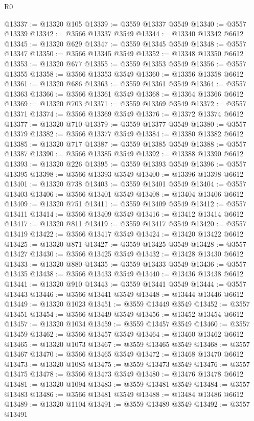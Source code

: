 \begin{lexlean}{R0}
\begin{coremodule}
@13337 := @13320 @105
@13339 := @3559 @13337 @3549
@13340 := @3557 @13339
@13342 := @3566 @13337 @3549
@13344 := @13340 @13342 @6612
@13345 := @13320 @629
@13347 := @3559 @13345 @3549
@13348 := @3557 @13347
@13350 := @3566 @13345 @3549
@13352 := @13348 @13350 @6612
@13353 := @13320 @677
@13355 := @3559 @13353 @3549
@13356 := @3557 @13355
@13358 := @3566 @13353 @3549
@13360 := @13356 @13358 @6612
@13361 := @13320 @686
@13363 := @3559 @13361 @3549
@13364 := @3557 @13363
@13366 := @3566 @13361 @3549
@13368 := @13364 @13366 @6612
@13369 := @13320 @703
@13371 := @3559 @13369 @3549
@13372 := @3557 @13371
@13374 := @3566 @13369 @3549
@13376 := @13372 @13374 @6612
@13377 := @13320 @710
@13379 := @3559 @13377 @3549
@13380 := @3557 @13379
@13382 := @3566 @13377 @3549
@13384 := @13380 @13382 @6612
@13385 := @13320 @717
@13387 := @3559 @13385 @3549
@13388 := @3557 @13387
@13390 := @3566 @13385 @3549
@13392 := @13388 @13390 @6612
@13393 := @13320 @226
@13395 := @3559 @13393 @3549
@13396 := @3557 @13395
@13398 := @3566 @13393 @3549
@13400 := @13396 @13398 @6612
@13401 := @13320 @738
@13403 := @3559 @13401 @3549
@13404 := @3557 @13403
@13406 := @3566 @13401 @3549
@13408 := @13404 @13406 @6612
@13409 := @13320 @751
@13411 := @3559 @13409 @3549
@13412 := @3557 @13411
@13414 := @3566 @13409 @3549
@13416 := @13412 @13414 @6612
@13417 := @13320 @811
@13419 := @3559 @13417 @3549
@13420 := @3557 @13419
@13422 := @3566 @13417 @3549
@13424 := @13420 @13422 @6612
@13425 := @13320 @871
@13427 := @3559 @13425 @3549
@13428 := @3557 @13427
@13430 := @3566 @13425 @3549
@13432 := @13428 @13430 @6612
@13433 := @13320 @880
@13435 := @3559 @13433 @3549
@13436 := @3557 @13435
@13438 := @3566 @13433 @3549
@13440 := @13436 @13438 @6612
@13441 := @13320 @910
@13443 := @3559 @13441 @3549
@13444 := @3557 @13443
@13446 := @3566 @13441 @3549
@13448 := @13444 @13446 @6612
@13449 := @13320 @1023
@13451 := @3559 @13449 @3549
@13452 := @3557 @13451
@13454 := @3566 @13449 @3549
@13456 := @13452 @13454 @6612
@13457 := @13320 @1034
@13459 := @3559 @13457 @3549
@13460 := @3557 @13459
@13462 := @3566 @13457 @3549
@13464 := @13460 @13462 @6612
@13465 := @13320 @1073
@13467 := @3559 @13465 @3549
@13468 := @3557 @13467
@13470 := @3566 @13465 @3549
@13472 := @13468 @13470 @6612
@13473 := @13320 @1085
@13475 := @3559 @13473 @3549
@13476 := @3557 @13475
@13478 := @3566 @13473 @3549
@13480 := @13476 @13478 @6612
@13481 := @13320 @1094
@13483 := @3559 @13481 @3549
@13484 := @3557 @13483
@13486 := @3566 @13481 @3549
@13488 := @13484 @13486 @6612
@13489 := @13320 @1104
@13491 := @3559 @13489 @3549
@13492 := @3557 @13491

\end{coremodule}
\end{lexlean}

